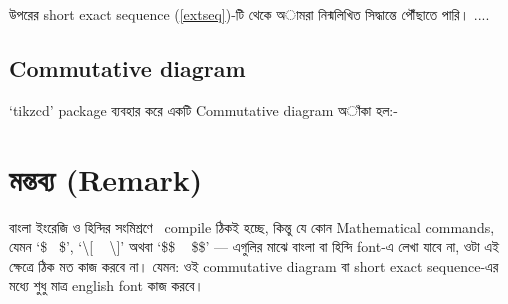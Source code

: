 \documentclass[12pt,reqno]{article}
\newcommand\bngn {\textbengali} %
\newcommand\bng {\fontsize{11}{12}\textbengali} %
\newcommand\eng {\textenglish}
\theoremstyle{plain}
\numberwithin{equation}{section}
\begin{document}
\noindent
\bng{উপরের } short exact sequence (\ref{extseq})\bng{-টি  থেকে অামরা নিন্মলিখিত সিদ্ধান্তে পৌঁছাতে পারি। ....}

\subsection{Commutative diagram}
`tikzcd' package \bng{ব্যবহার করে একটি} Commutative diagram \bng{অাঁকা হল:-}

\begin{center}
\end{center}

\section{\bngn{মন্তব্য} (Remark)}
\small\bng{বাংলা ইংরেজি ও  হিন্দির সংমিশ্রণে } \XeLaTeX \, compile \bng{ঠিকই হচ্ছে, কিন্তু যে কোন} Mathematical commands, \bng{যেমন } `\$\,\,\, \$', `\textbackslash[ \,\,\, \textbackslash]' \bng{অথবা} `\$\$ \,\,\, \$\$' --- \bng{এগুলির মাঝে বাংলা বা হিন্দি \eng{font}-এ লেখা যাবে না, ওটা এই ক্ষেত্রে ঠিক মত কাজ করবে না। যেমন: ওই} commutative diagram \bng{ বা } short exact sequence\bng{-এর মধ্যে শুধু মাত্র} english font \bng{কাজ করবে।}
\end{document}
